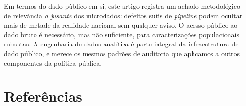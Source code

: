\documentclass[12pt,a4paper,oneside]{article}
\begin{document}
Em termos do dado público em si, este artigo registra um achado
metodológico de relevância \textit{a jusante} dos microdados:
defeitos sutis de \textit{pipeline} podem ocultar mais de
metade da realidade nacional sem qualquer aviso. O acesso público
ao dado bruto é necessário, mas não suficiente, para
caracterizações populacionais robustas. A engenharia de dados
analítica é parte integral da infraestrutura de dado público,
e merece os mesmos padrões de auditoria que aplicamos a outros
componentes da política pública.

\section*{Referências}\label{sec:ref}
\end{document}
